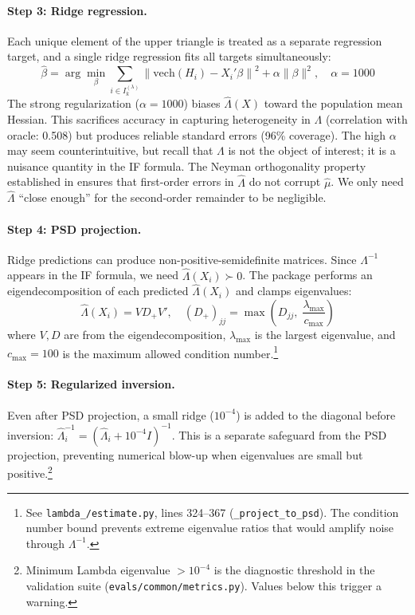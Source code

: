 \paragraph{Step 3: Ridge regression.} Each unique element of the upper triangle is treated as a separate regression target, and a single ridge regression \citep{hoerl1970ridge} fits all targets simultaneously:
\begin{equation}\label{eq:ridge_lambda}
    \hat{\beta} = \arg\min_\beta \sum_{i \in I_k^{(\lambda)}} \left\|\mathrm{vech}(H_i) - X_i'\beta\right\|^2 + \alpha \|\beta\|^2, \quad \alpha = 1000
\end{equation}
The strong regularization ($\alpha = 1000$) biases $\hat{\Lambda}(X)$ toward the population mean Hessian. This sacrifices accuracy in capturing heterogeneity in $\Lambda$ (correlation with oracle: 0.508) but produces reliable standard errors (96\% coverage). The high $\alpha$ may seem counterintuitive, but recall that $\Lambda$ is not the object of interest; it is a nuisance quantity in the IF formula. The Neyman orthogonality property established in \citet{farrell2025deep} ensures that first-order errors in $\hat{\Lambda}$ do not corrupt $\hat{\mu}$. We only need $\hat{\Lambda}$ ``close enough'' for the second-order remainder to be negligible.

\paragraph{Step 4: PSD projection.} Ridge predictions can produce non-positive-semidefinite matrices. Since $\Lambda^{-1}$ appears in the IF formula, we need $\hat{\Lambda}(X_i) \succ 0$. The package performs an eigendecomposition of each predicted $\hat{\Lambda}(X_i)$ and clamps eigenvalues:
\begin{equation}\label{eq:psd_proj}
    \hat{\Lambda}(X_i) = V D_+ V', \quad (D_+)_{jj} = \max\!\left(D_{jj}, \; \frac{\lambda_{\max}}{c_{\max}}\right)
\end{equation}
where $V, D$ are from the eigendecomposition, $\lambda_{\max}$ is the largest eigenvalue, and $c_{\max} = 100$ is the maximum allowed condition number.\footnote{See \texttt{lambda\_/estimate.py}, lines 324--367 (\texttt{\_project\_to\_psd}). The condition number bound prevents extreme eigenvalue ratios that would amplify noise through $\Lambda^{-1}$.}

\paragraph{Step 5: Regularized inversion.} Even after PSD projection, a small ridge ($10^{-4}$) is added to the diagonal before inversion: $\hat{\Lambda}_i^{-1} = (\hat{\Lambda}_i + 10^{-4} I)^{-1}$. This is a separate safeguard from the PSD projection, preventing numerical blow-up when eigenvalues are small but positive.\footnote{Minimum Lambda eigenvalue $> 10^{-4}$ is the diagnostic threshold in the validation suite (\texttt{evals/common/metrics.py}). Values below this trigger a warning.}

